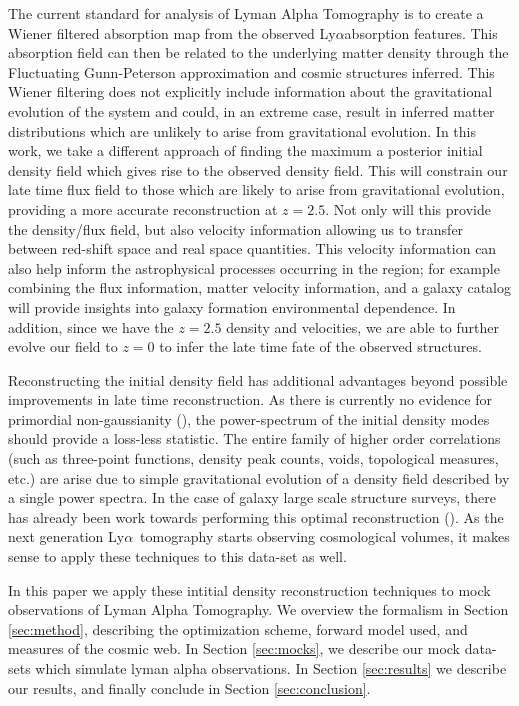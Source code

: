 \documentclass[times]{aastex62}
\newcommand{\lya}{Ly$\alpha$}
\begin{document}
The current standard for analysis of Lyman Alpha Tomography is to create a Wiener filtered absorption map from the observed \lya absorption features.\cite{2001Pichon,2008Caucci,2014LeeObserving} This absorption field can then be related to the underlying matter density through the Fluctuating Gunn-Peterson approximation and cosmic structures inferred. This Wiener filtering does not explicitly include information about the gravitational evolution of the system and could, in an extreme case, result in inferred matter distributions which are unlikely to arise from gravitational evolution. In this work, we take a different approach of finding the maximum a posterior initial density field which gives rise to the observed density field. This will constrain our late time flux field to those which are likely to arise from gravitational evolution, providing a more accurate reconstruction at $z=2.5$. Not only will this provide the density/flux field, but also velocity information allowing us to transfer between red-shift space and real space quantities. This velocity information can also help inform the astrophysical processes occurring in the region; for example combining the flux information, matter velocity information, and a galaxy catalog will provide insights into galaxy formation environmental dependence. In addition, since we have the $z=2.5$ density and velocities, we are able to further evolve our field to $z=0$ to infer the late time fate of the observed structures. 




Reconstructing the initial density field has additional advantages beyond possible improvements in late time reconstruction. As there is currently no evidence for primordial non-gaussianity (\cite{2018arXiv180706209P}), the power-spectrum of the initial density modes should provide a loss-less statistic. The entire family of higher order correlations  (such as three-point functions, density peak counts, voids, topological measures, etc.) are arise due to simple gravitational evolution of a density field described by a single power spectra. In the case of galaxy large scale structure surveys, there has already been work towards performing this optimal reconstruction (\cite{seljak2017towards}). As the next generation \lya\ tomography starts observing cosmological volumes, it makes sense to apply these techniques to this data-set as well.

In this paper we apply these intitial density reconstruction techniques to mock observations of Lyman Alpha Tomography. We overview the formalism in Section \ref{sec:method}, describing the optimization scheme, forward model used, and measures of the cosmic web. In Section \ref{sec:mocks}, we describe our mock data-sets which simulate lyman alpha observations. In Section \ref{sec:results} we describe our results, and finally conclude in Section \ref{sec:conclusion}.
\end{document}
